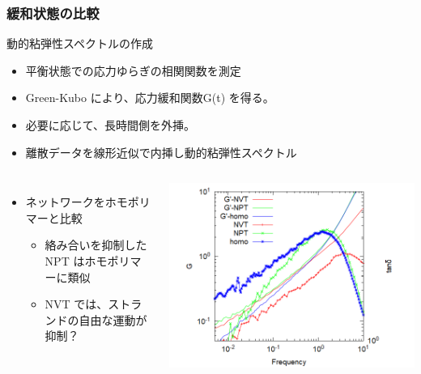 \documentclass[12pt, dvipdfmx]{beamer}
\begin{document}
\begin{frame}
    \frametitle{緩和状態の比較}
	\begin{exampleblock}{動的粘弾性スペクトルの作成}
		\begin{itemize}
			\item 平衡状態での応力ゆらぎの相関関数を測定
			\item Green-Kubo により、応力緩和関数G(t) を得る。
			\item 必要に応じて、長時間側を外挿。
			\item 離散データを線形近似で内挿し動的粘弾性スペクトル
		\end{itemize}
	\end{exampleblock}
    \begin{columns}[onlytextwidth]
            \begin{itemize}
                \item ネットワークをホモポリマーと比較
                \begin{itemize}
                    \item 絡み合いを抑制した NPT はホモポリマーに類似
                    \item NVT では、ストランドの自由な運動が抑制？
                \end{itemize}
            \end{itemize}
            \includegraphics[width=\textwidth]{gw_eq.png}
    \end{columns}
\end{frame}
\end{document}
